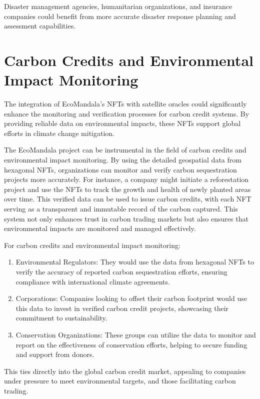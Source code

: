 \documentclass{scrreport}
\begin{document}
Disaster management agencies, humanitarian organizations, and insurance companies could benefit from more accurate disaster response planning and assessment capabilities.

\section{Carbon Credits and Environmental Impact Monitoring}

The integration of EcoMandala’s NFTs with satellite oracles could significantly enhance the monitoring and verification processes for carbon credit systems. By providing reliable data on environmental impacts, these NFTs support global efforts in climate change mitigation.

The EcoMandala project can be instrumental in the field of carbon credits and environmental impact monitoring. By using the detailed geospatial data from hexagonal NFTs, organizations can monitor and verify carbon sequestration projects more accurately. For instance, a company might initiate a reforestation project and use the NFTs to track the growth and health of newly planted areas over time. This verified data can be used to issue carbon credits, with each NFT serving as a transparent and immutable record of the carbon captured. This system not only enhances trust in carbon trading markets but also ensures that environmental impacts are monitored and managed effectively.

For carbon credits and environmental impact monitoring:
\begin{enumerate}
    \item Environmental Regulators: They would use the data from hexagonal NFTs to verify the accuracy of reported carbon sequestration efforts, ensuring compliance with international climate agreements.
    \item Corporations: Companies looking to offset their carbon footprint would use this data to invest in verified carbon credit projects, showcasing their commitment to sustainability.
    \item Conservation Organizations: These groups can utilize the data to monitor and report on the effectiveness of conservation efforts, helping to secure funding and support from donors.
\end{enumerate}

This ties directly into the global carbon credit market, appealing to companies under pressure to meet environmental targets, and those facilitating carbon trading.
\end{document}
